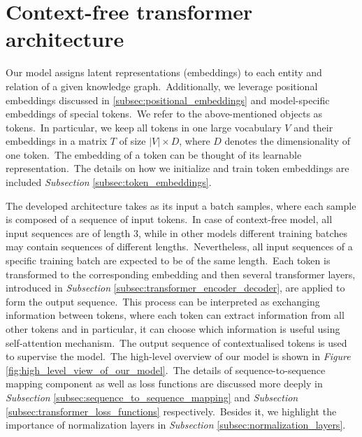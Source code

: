 \documentclass[longabstract, english, mgr]{iithesis}
\theoremstyle{default_theorem_style}\newtheorem{theorem}{Theorem}
\theoremstyle{default_theorem_style}\newtheorem{definition}{Definition}
\begin{document}
\section{Context-free transformer architecture}

Our model assigns latent representations (embeddings) to each entity and relation of a given knowledge
graph.\ Additionally, we leverage positional embeddings discussed in \ref{subsec:positional_embeddings} and
model-specific embeddings of special tokens.\ We refer to the above-mentioned objects as tokens.\ In particular, we
keep all tokens in one large vocabulary $V$ and their embeddings in a matrix $T$ of size $|V| \times D$, where $D$
denotes the dimensionality of one token.\ The embedding of a token can be thought of its learnable
representation.\ The details on how we initialize and train token embeddings are
included \textit{Subsection} \ref{subsec:token_embeddings}.\newline

\noindent The developed architecture takes as its input a batch samples, where each sample is composed of a sequence of
input tokens.\ In case of context-free model, all input sequences are of length 3, while in other models different
training batches may contain sequences of different lengths.\ Nevertheless, all input sequences of a specific
training batch are expected to be of the same length.\ Each token is transformed to the corresponding embedding and then
several transformer layers, introduced in \textit{Subsection} \ref{subsec:transformer_encoder_decoder}, are applied to
form the output sequence.\ This process can be interpreted as exchanging information between tokens, where each token
can extract information from all other tokens and in particular, it can choose which information is useful using
self-attention mechanism.\ The output sequence of contextualised tokens is used to supervise the model.\ The high-level
overview of our model is shown in \textit{Figure} \ref{fig:high_level_view_of_our_model}.\ The details of
sequence-to-sequence mapping component as well as loss functions are discussed more deeply in \textit{Subsection}
\ref{subsec:sequence_to_sequence_mapping} and \textit{Subsection} \ref{subsec:transformer_loss_functions}
respectively.\ Besides it, we highlight the importance of normalization layers in \textit{Subsection}
\ref{subsec:normalization_layers}.\newline
\end{document}
